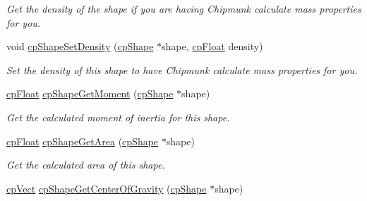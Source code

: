 \begin{DoxyCompactItemize}
\begin{DoxyCompactList}\small\item\em Get the density of the shape if you are having Chipmunk calculate mass properties for you. \end{DoxyCompactList}\item 
\hypertarget{group__cp_shape_ga67a640d42e192801d096ed5838ad658c}{}void \hyperlink{group__cp_shape_ga67a640d42e192801d096ed5838ad658c}{cp\+Shape\+Set\+Density} (\hyperlink{structcp_shape}{cp\+Shape} $\ast$shape, \hyperlink{group__basic_types_gac1ed65573e035bf892505768c852d8d3}{cp\+Float} density)\label{group__cp_shape_ga67a640d42e192801d096ed5838ad658c}

\begin{DoxyCompactList}\small\item\em Set the density of this shape to have Chipmunk calculate mass properties for you. \end{DoxyCompactList}\item 
\hypertarget{group__cp_shape_ga879d6b7e7c33d0fa2abab3fabd3ed181}{}\hyperlink{group__basic_types_gac1ed65573e035bf892505768c852d8d3}{cp\+Float} \hyperlink{group__cp_shape_ga879d6b7e7c33d0fa2abab3fabd3ed181}{cp\+Shape\+Get\+Moment} (\hyperlink{structcp_shape}{cp\+Shape} $\ast$shape)\label{group__cp_shape_ga879d6b7e7c33d0fa2abab3fabd3ed181}

\begin{DoxyCompactList}\small\item\em Get the calculated moment of inertia for this shape. \end{DoxyCompactList}\item 
\hypertarget{group__cp_shape_gae6907139a4570623b44421ed46465b84}{}\hyperlink{group__basic_types_gac1ed65573e035bf892505768c852d8d3}{cp\+Float} \hyperlink{group__cp_shape_gae6907139a4570623b44421ed46465b84}{cp\+Shape\+Get\+Area} (\hyperlink{structcp_shape}{cp\+Shape} $\ast$shape)\label{group__cp_shape_gae6907139a4570623b44421ed46465b84}

\begin{DoxyCompactList}\small\item\em Get the calculated area of this shape. \end{DoxyCompactList}\item 
\hypertarget{group__cp_shape_gafbd7eadc2c4e704c3865faa71f4aa8be}{}\hyperlink{structcp_vect}{cp\+Vect} \hyperlink{group__cp_shape_gafbd7eadc2c4e704c3865faa71f4aa8be}{cp\+Shape\+Get\+Center\+Of\+Gravity} (\hyperlink{structcp_shape}{cp\+Shape} $\ast$shape)\label{group__cp_shape_gafbd7eadc2c4e704c3865faa71f4aa8be}


\end{DoxyCompactItemize}
